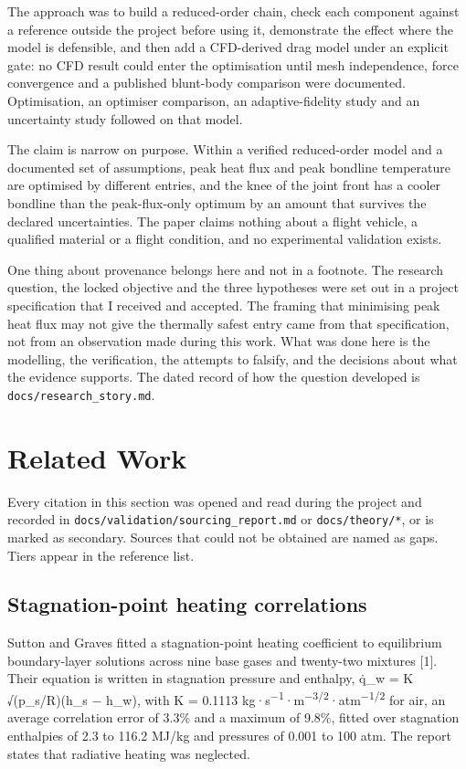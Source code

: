 \documentclass[
  a4paper,
  11pt]{article}
\begin{document}
The approach was to build a reduced-order chain, check each component
against a reference outside the project before using it, demonstrate the
effect where the model is defensible, and then add a CFD-derived drag
model under an explicit gate: no CFD result could enter the optimisation
until mesh independence, force convergence and a published blunt-body
comparison were documented. Optimisation, an optimiser comparison, an
adaptive-fidelity study and an uncertainty study followed on that model.

The claim is narrow on purpose. Within a verified reduced-order model
and a documented set of assumptions, peak heat flux and peak bondline
temperature are optimised by different entries, and the knee of the
joint front has a cooler bondline than the peak-flux-only optimum by an
amount that survives the declared uncertainties. The paper claims
nothing about a flight vehicle, a qualified material or a flight
condition, and no experimental validation exists.

One thing about provenance belongs here and not in a footnote. The
research question, the locked objective and the three hypotheses were
set out in a project specification that I received and accepted. The
framing that minimising peak heat flux may not give the thermally safest
entry came from that specification, not from an observation made during
this work. What was done here is the modelling, the verification, the
attempts to falsify, and the decisions about what the evidence supports.
The dated record of how the question developed is
\texttt{docs/\allowbreak{}research\_\allowbreak{}story.md}.

\section{Related Work}

Every citation in this section was opened and read during the project
and recorded in
\texttt{docs/\allowbreak{}validation/\allowbreak{}sourcing\_\allowbreak{}report.md}
or \texttt{docs/\allowbreak{}theory/\allowbreak{}*}, or is marked as
secondary. Sources that could not be obtained are named as gaps. Tiers
appear in the reference list.

\subsection{Stagnation-point heating correlations}

Sutton and Graves fitted a stagnation-point heating coefficient to
equilibrium boundary-layer solutions across nine base gases and
twenty-two mixtures {[}1{]}. Their equation is written in stagnation
pressure and enthalpy, \.{q}\_w = K √(p\_s/R)(h\_s − h\_w), with K =
0.1113
kg·s\textsuperscript{−1}·m\textsuperscript{−3/2}·atm\textsuperscript{−1/2}
for air, an average correlation error of 3.3\% and a maximum of 9.8\%,
fitted over stagnation enthalpies of 2.3 to 116.2 MJ/kg and pressures of
0.001 to 100 atm. The report states that radiative heating was
neglected.
\end{document}
